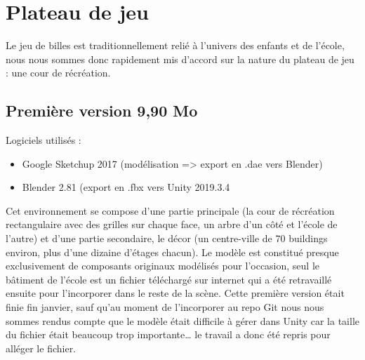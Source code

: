 \documentclass{article}
\begin{document}
\section{Plateau de jeu}
Le jeu de billes est traditionnellement relié à l’univers des enfants et de l’école, nous nous sommes donc rapidement mis d’accord sur la nature du plateau de jeu : une cour de récréation.

\subsection{Première version 9,90 Mo}
Logiciels utilisés :
\begin{itemize}
    \item Google Sketchup 2017 (modélisation => export en .dae vers Blender)
    \item Blender 2.81 (export en .fbx vers Unity 2019.3.4
\end{itemize}

Cet environnement se compose d’une partie principale (la cour de récréation rectangulaire avec des grilles sur chaque face, un arbre d’un côté et l’école de l’autre) et d’une partie 	secondaire, le décor (un centre-ville de 70 buildings environ, plus d’une dizaine d’étages 	chacun). Le modèle est constitué presque exclusivement de composants originaux modélisés pour l’occasion, seul le bâtiment de l’école est un fichier téléchargé sur internet qui a été retravaillé ensuite pour l’incorporer dans le reste de la scène. Cette première version était finie fin janvier, sauf qu’au moment de l’incorporer au repo Git nous nous sommes rendus compte que le modèle était difficile à gérer dans Unity car la taille du fichier était beaucoup trop importante… le travail a donc été repris pour alléger le fichier.

\begin{figure}[htp] 
    \centering
    \hfill%
\end{figure}
\end{document}
